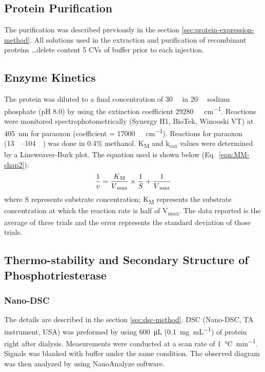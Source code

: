 \begin{refsection}
\subsection{Protein Purification}
The purification was described previously in the section
\ref{sec:protein-expression-method}. All solutions used in the extraction and
purification of recombinant proteins \ldots delete content 5 CVs of buffer
prior to each injection.

\subsection{Enzyme Kinetics}

The protein was diluted to a final concentration of \SI{30}{\nano\Molar} in
\SI{20}{\milli\Molar} sodium phosphate (pH 8.0) by using the extinction
coefficient \SI{29280}{\per\Molar\per\cm}. Reactions were monitored
spectrophotometrically (Synergy H1, BioTek, Winooski VT) at \SI{405}{\nm} for
paraoxon (coefficient = \SI{17000}{\per\Molar\per\cm}).  Reactions for paraoxon
(\SIrange{13}{104}{\micro\Molar}) was done in 0.4\% methanol.
K\textsubscript{M} and k\textsubscript{cat} values were determined by a
Lineweaver-Burk plot.\cite{Baker2011b} The equation used is shown below
(Eq.~\ref{eqn:MM-chap2}): 
\begin{equation} 
    \frac{1}{v} =
    \frac{K\textsubscript{M}}{V\textsubscript{max}}\times\frac{1}{S} +
    \frac{1}{V\textsubscript{max}} 
    \label{eqn:MM-chap2}
\end{equation}
where S represents substrate concentration; K\textsubscript{M} represents the
substrate concentration at which the reaction rate is half of
V\textsubscript{max}. The data reported is the average of three trials and the
error represents the standard deviation of those trials.

\subsection{Thermo-stability and Secondary Structure of Phosphotriesterase}

\subsubsection{Nano-DSC}

The details are described in the section \ref{sec:dsc-method}. DSC (Nano-DSC,
TA instrument, USA) was preformed by using \SI{600}{\micro\L}
(\SI{0.1}{\mg\per\mL}) of protein right after dialysis. Measurements were
conducted at a scan rate of \SI{1}{\celsius\per\minute}. Signals was blanked with
buffer under the same condition.  The observed diagram was then analyzed by
using NanoAnalyze software.


\end{refsection}
